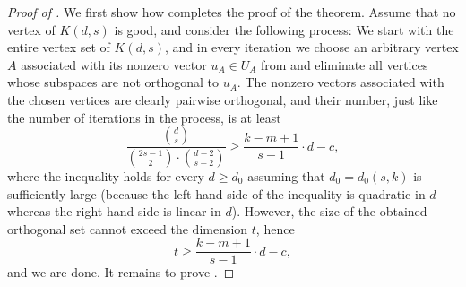 \begin{proof}[Proof of ]
We first show how  completes the proof of the theorem.
Assume that no vertex of $K(d,s)$ is good, and consider the  following process: We start with the entire vertex set of $K(d,s)$, and in every iteration we choose an arbitrary vertex $A$ associated with its nonzero vector $u_A \in U_A$ from  and eliminate all vertices whose subspaces are not orthogonal to $u_A$. The nonzero vectors associated with the chosen vertices are clearly pairwise orthogonal, and their number, just like the number of iterations in the process, is at least
\[\frac{\binom{d}{s}}{\binom{2s-1}{2} \cdot \binom{d-2}{s-2}} \geq \frac{k-m+1}{s-1} \cdot d-c,\]
where the inequality holds for every $d \geq d_0$ assuming that $d_0 = d_0(s,k)$ is sufficiently large (because the left-hand side of the inequality is quadratic in $d$ whereas the right-hand side is linear in $d$).
However, the size of the obtained orthogonal set cannot exceed the dimension $t$, hence
\[t \geq \frac{k-m+1}{s-1} \cdot d-c,\]
and we are done. It remains to prove .


\end{proof}
